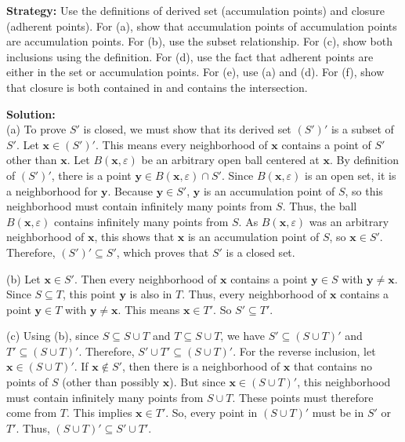 \noindent\textbf{Strategy:} Use the definitions of derived set (accumulation points) and closure (adherent points). For (a), show that accumulation points of accumulation points are accumulation points. For (b), use the subset relationship. For (c), show both inclusions using the definition. For (d), use the fact that adherent points are either in the set or accumulation points. For (e), use (a) and (d). For (f), show that closure is both contained in and contains the intersection.

\bigskip\noindent\textbf{Solution:}\\
(a) To prove $S'$ is closed, we must show that its derived set $(S')'$ is a subset of $S'$. Let $\mathbf{x} \in (S')'$. This means every neighborhood of $\mathbf{x}$ contains a point of $S'$ other than $\mathbf{x}$. Let $B(\mathbf{x}, \varepsilon)$ be an arbitrary open ball centered at $\mathbf{x}$. By definition of $(S')'$, there is a point $\mathbf{y} \in B(\mathbf{x}, \varepsilon) \cap S'$. Since $B(\mathbf{x}, \varepsilon)$ is an open set, it is a neighborhood for $\mathbf{y}$. Because $\mathbf{y} \in S'$, $\mathbf{y}$ is an accumulation point of $S$, so this neighborhood must contain infinitely many points from $S$. Thus, the ball $B(\mathbf{x}, \varepsilon)$ contains infinitely many points from $S$. As $B(\mathbf{x}, \varepsilon)$ was an arbitrary neighborhood of $\mathbf{x}$, this shows that $\mathbf{x}$ is an accumulation point of $S$, so $\mathbf{x} \in S'$. Therefore, $(S')' \subseteq S'$, which proves that $S'$ is a closed set.

(b) Let $\mathbf{x} \in S'$. Then every neighborhood of $\mathbf{x}$ contains a point $\mathbf{y} \in S$ with $\mathbf{y} \neq \mathbf{x}$. Since $S \subseteq T$, this point $\mathbf{y}$ is also in $T$. Thus, every neighborhood of $\mathbf{x}$ contains a point $\mathbf{y} \in T$ with $\mathbf{y} \neq \mathbf{x}$. This means $\mathbf{x} \in T'$. So $S' \subseteq T'$.

(c) Using (b), since $S \subseteq S \cup T$ and $T \subseteq S \cup T$, we have $S' \subseteq (S \cup T)'$ and $T' \subseteq (S \cup T)'$. Therefore, $S' \cup T' \subseteq (S \cup T)'$. For the reverse inclusion, let $\mathbf{x} \in (S \cup T)'$. If $\mathbf{x} \notin S'$, then there is a neighborhood of $\mathbf{x}$ that contains no points of $S$ (other than possibly $\mathbf{x}$). But since $\mathbf{x} \in (S \cup T)'$, this neighborhood must contain infinitely many points from $S \cup T$. These points must therefore come from $T$. This implies $\mathbf{x} \in T'$. So, every point in $(S \cup T)'$ must be in $S'$ or $T'$. Thus, $(S \cup T)' \subseteq S' \cup T'$.

